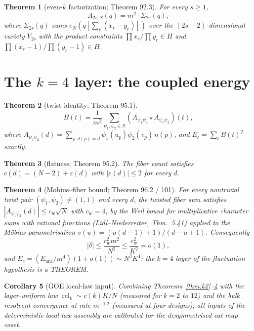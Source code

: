 \documentclass[11pt]{article}
\newtheorem{theorem}{Theorem}[section]
\newtheorem{corollary}[theorem]{Corollary}
\begin{document}
\begin{theorem}[even-$k$ factorization; Theorem 92.3]
\label{thm:evenk}
For every $s \ge 1$,
\[
  A_{2s,S}(q) = m^2 \cdot \Sigma_{2s}(q),
\]
where $\Sigma_{2s}(q)$ sums $e_N(q[\sum_r(x_r{-}y_r)])$ over the
$(2s{-}2)$-dimensional variety $V_{2s}$ with the product constraints
$\prod x_r/\prod y_r \in H$ and $\prod(x_r{-}1)/\prod(y_r{-}1) \in H$.
\end{theorem}

\section{The \texorpdfstring{$k=4$}{k=4} layer: the coupled energy}\label{sec:closure}

\begin{theorem}[twist identity; Theorem 95.1]
\label{thm:twist}
\[
  B(t) = \frac{1}{m^2}\sum_{\psi_1,\psi_2 \in S}
  (A_{\psi_1\psi_2} \star A_{\psi_1\psi_2})(t),
\]
where $A_{\psi_1\psi_2}(d) = \sum_{p: d(p)=d} \psi_1(u_p)\psi_2(v_p)\,
n(p)$, and $E_c = \sum_t B(t)^2$ exactly.
\end{theorem}

\begin{theorem}[flatness; Theorem 95.2]
\label{thm:flatness}
The fiber count satisfies $c(d) = (N{-}2) + \varepsilon(d)$ with
$|\varepsilon(d)| \le 2$ for every $d$.
\end{theorem}

\begin{theorem}[M\"obius--fiber bound; Theorem 96.2 / 101]
\label{thm:mobius}
For every nontrivial twist pair $(\psi_1,\psi_2) \neq (1,1)$ and every
$d$, the twisted fiber sum satisfies
$|A_{\psi_1\psi_2}(d)| \le c_w\sqrt{N}$ with $c_w = 4$, by the Weil
bound for multiplicative character sums with rational functions
(Lidl--Niederreiter, Thm.~5.41) applied to the M\"obius parametrisation
$v(u) = (u(d{-}1)+1)/(d{-}u+1)$.  Consequently
\[
  |\delta| \le \frac{c_w^2 m^2}{N^2} \le \frac{c_w^2}{K^2} = o(1),
\]
and $E_c = (E_{\mathrm{unc}}/m^4)(1 + o(1)) \sim N^3 K^4$: the $k{=}4$
layer of the fluctuation hypothesis is a THEOREM.
\end{theorem}

\begin{corollary}[GOE local-law input]
\label{cor:locallaw}
Combining Theorems~\ref{thm:k2}--\ref{thm:mobius} with the
layer-uniform law $\operatorname{rel}_k \sim c(k)K/N$ (measured for
$k = 2$ to $12$) and the bulk resolvent convergence at rate
$m^{-1.2}$ (measured at four designs), all inputs of the
deterministic local-law assembly are calibrated for the
desymmetrised cat-map coset.
\end{corollary}
\end{document}
